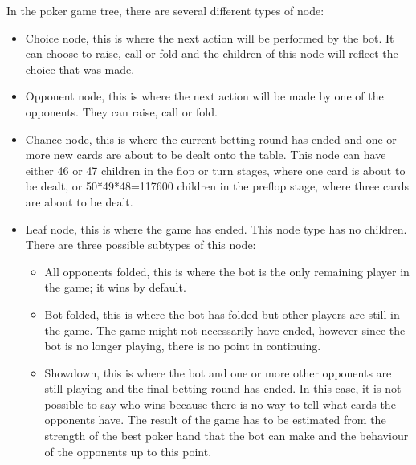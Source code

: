 In the poker game tree, there are several different types of node:
\begin{itemize}
\item Choice node, this is where the next action will be performed by the bot. It can choose to raise, call or fold and the children of this node will reflect the choice that was made.
\item Opponent node, this is where the next action will be made by one of the opponents. They can raise, call or fold. 
\item Chance node, this is where the current betting round has ended and one or more new cards are about to be dealt onto the table. This node can have either 46 or 47 children in the flop or turn stages, where one card is about to be dealt, or 50*49*48=117600 children in the preflop stage, where three cards are about to be dealt. 
\item Leaf node, this is where the game has ended. This node type has no children. There are three possible subtypes of this node:
	\begin{itemize}
	\item All opponents folded, this is where the bot is the only remaining player in the game; it wins by default. 
	\item Bot folded, this is where the bot has folded but other players are still in the game. The game might not necessarily have ended, however since the bot is no longer playing, there is no point in continuing.
	\item Showdown, this is where the bot and one or more other opponents are still playing and the final betting round has ended. In this case, it is not possible to say who wins because there is no way to tell what cards the opponents have. The result of the game has to be estimated from the strength of the best poker hand that the bot can make and the behaviour of the opponents up to this point.
	\end{itemize}
\end{itemize}







\section{\mcts}									%

